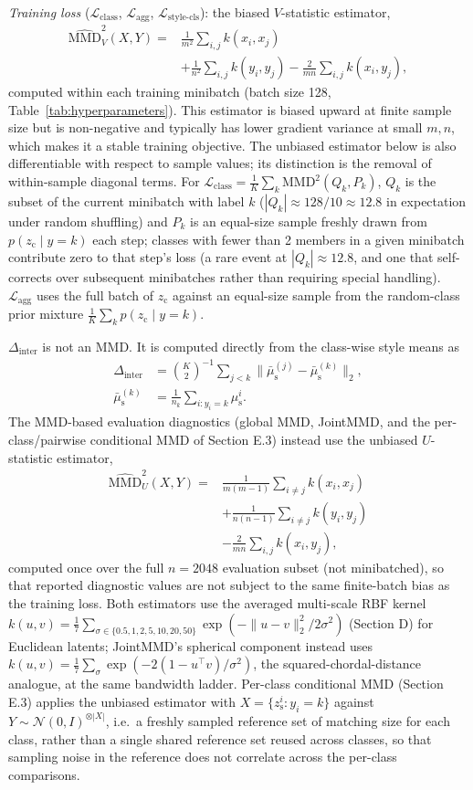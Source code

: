\documentclass[letterpaper]{article}
\newcommand{\zc}{z_{\mathrm{c}}}
\newcommand{\zs}{z_{\mathrm{s}}}
\newcommand{\mus}{\mu_{\mathrm{s}}}
\newcommand{\MMD}{\mathrm{MMD}}
\newcommand{\Dinter}{\Delta_{\mathrm{inter}}}
\begin{document}
\emph{Training loss} ($\mathcal L_{\mathrm{class}}$, $\mathcal L_{\mathrm{agg}}$,
$\mathcal L_{\mathrm{style\text{-}cls}}$): the biased $V$-statistic estimator,
\[
\begin{aligned}
\widehat{\MMD}^2_V(X,Y)={}&\tfrac1{m^2}\!\sum_{i,j}k(x_i,x_j)\\
&+\tfrac1{n^2}\!\sum_{i,j}k(y_i,y_j)
-\tfrac2{mn}\!\sum_{i,j}k(x_i,y_j),
\end{aligned}
\]
computed within each training minibatch (batch size 128,
Table~\ref{tab:hyperparameters}). This estimator is biased upward at finite
sample size but is non-negative and typically has lower gradient variance at
small $m,n$, which makes it a stable training objective. The unbiased
estimator below is also differentiable with respect to sample values; its
distinction is the removal of within-sample diagonal terms. For
$\mathcal L_{\mathrm{class}}=\frac1K\sum_k\MMD^2(Q_k,P_k)$, $Q_k$ is the
subset of the current minibatch with label $k$ ($|Q_k|\approx128/10\approx12.8$
in expectation under random shuffling) and $P_k$ is an equal-size sample
freshly drawn from $p(\zc\mid y{=}k)$ each step; classes with fewer than 2
members in a given minibatch contribute zero to that step's loss (a rare
event at $|Q_k|\approx12.8$, and one that self-corrects over subsequent
minibatches rather than requiring special handling). $\mathcal L_{\mathrm{agg}}$
uses the full batch of $\zc$ against an equal-size sample from the random-class
prior mixture $\frac1K\sum_k p(\zc\mid y{=}k)$.

$\Dinter$ is not an MMD. It is computed directly from the class-wise style
means as
\begin{align*}
\Dinter&=\binom{K}{2}^{-1}\sum_{j<k}
\|\bar\mus^{(j)}-\bar\mus^{(k)}\|_2,\\
\bar\mus^{(k)}&=\frac{1}{n_k}\sum_{i:y_i=k}\mus^i.
\end{align*}
The MMD-based evaluation diagnostics (global MMD, JointMMD, and the
per-class/pairwise conditional MMD of Section E.3) instead use the unbiased
$U$-statistic estimator,
\[
\begin{aligned}
\widehat{\MMD}^2_U(X,Y)={}&\tfrac1{m(m-1)}\!\sum_{i\ne j}k(x_i,x_j)\\
&+\tfrac1{n(n-1)}\!\sum_{i\ne j}k(y_i,y_j)\\
&-\tfrac2{mn}\!\sum_{i,j}k(x_i,y_j),
\end{aligned}
\]
computed once over the full $n{=}2048$ evaluation subset (not minibatched),
so that reported diagnostic values are not subject to the same finite-batch
bias as the training loss. Both estimators use the averaged multi-scale RBF kernel
$k(u,v)=\frac1{7}\sum_{\sigma\in\{0.5,1,2,5,10,20,50\}}\exp(-\|u-v\|_2^2/2\sigma^2)$
(Section D) for Euclidean latents; JointMMD's spherical component instead
uses $k(u,v)=\frac1{7}\sum_\sigma\exp(-2(1-u^\top v)/\sigma^2)$, the
squared-chordal-distance analogue, at the same bandwidth ladder. Per-class conditional MMD
(Section E.3) applies the unbiased estimator with $X=\{\zs^i:y_i{=}k\}$
against $Y\sim\mathcal N(0,I)^{\otimes|X|}$, i.e.\ a freshly sampled reference
set of matching size for each class, rather than a single shared reference
set reused across classes, so that sampling noise in the reference does not
correlate across the per-class comparisons.
\end{document}
